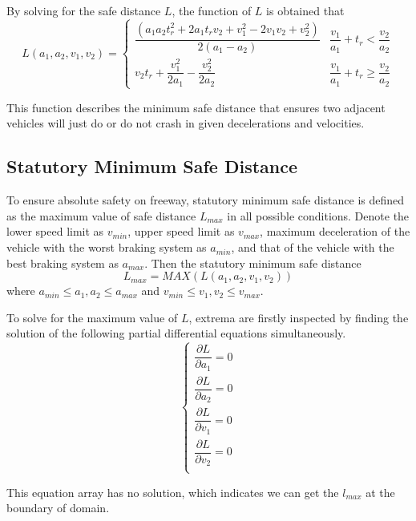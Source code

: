 By solving for the safe distance $ L $, the function of 
$ L $ is obtained that 
\begin{equation}
L(a_1, a_2, v_1, v_2) = 
\left \{
\begin{array}{cl}
\dfrac{(a_1a_2t_r^2 + 2a_1t_rv_2 + v_1^2 - 2v_1v_2 + 
v_2^2)}{2(a_1-a_2)} & 
\dfrac{v_1}{a_1} + t_r < \dfrac{v_2}{a_2}\\
v_2 t_r + \dfrac{v_1 ^ 2}{2a_1} -\dfrac{v_2^2}{2a_2} & 
\dfrac{v_1}{a_1} + t_r \geq \dfrac{v_2}{a_2}
\end{array}
\right .
\end{equation}

This function describes the minimum safe distance that 
ensures two adjacent vehicles will just do or do not 
crash in given decelerations and velocities.


\subsection{Statutory Minimum Safe Distance}

To ensure absolute safety on freeway, statutory minimum 
safe distance is defined as the maximum value of safe 
distance $ L_{max} $ in all possible conditions. Denote 
the lower speed limit as $ v_{min} $, upper speed limit as 
$ v_{max} $, maximum deceleration of the vehicle with the 
worst braking system as $ a_{min} $, and that of the 
vehicle with the best braking system as $ a_{max} $. Then 
the statutory minimum safe distance
\begin{equation}
L_{max} = MAX(L(a_1,a_2,v_1,v_2))
\end{equation}
where $ a_{min} \le a_1,a_2 \le a_{max} $ and $ v_{min} 
\le v_1,v_2 \le v_{max} $.

To solve for the maximum value of $ L $, extrema are 
firstly inspected by finding the solution of the following 
partial differential equations simultaneously.
\begin{displaymath}
\left \{
\begin{array}{cl}
\dfrac{\partial L}{\partial{a_1}} = 0 \\
\dfrac{\partial L}{\partial{a_2}} = 0 \\
\dfrac{\partial L}{\partial{v_1}} = 0 \\
\dfrac{\partial L}{\partial{v_2}} = 0 \\
\end{array}
\right .
\end{displaymath}

This equation array has no solution, which indicates we can 
get the $l_{max}$ at the boundary of domain.

